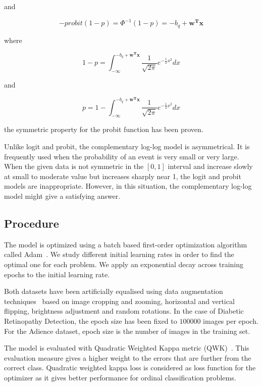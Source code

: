 \documentclass[journal]{IEEEtran}
\begin{document}
\begin{enumerate}
		and
		
		\begin{equation}
		-probit(1-p) = \Phi^{-1}(1-p) = -b_q + \mathbf{w^Tx}
		\end{equation}
		
		where
		
		\begin{equation}
		1 - p = \int_{-\infty}^{-b_q + \mathbf{w^Tx}} \frac{1}{\sqrt{2\pi}} e^{-\frac{1}{2}x^2} dx
		\end{equation}
		
		and
		
		\begin{equation}
		p = 1 - \int_{-\infty}^{-b_q + \mathbf{w^Tx}} \frac{1}{\sqrt{2\pi}} e^{-\frac{1}{2}x^2} dx
		\end{equation}

		the symmetric property for the probit function has been proven.
	\end{enumerate}
	
	
	Unlike logit and probit, the complementary log-log model is asymmetrical. It is frequently used when the probability of an event is very small or very large. When the given data is not symmetric in the $[0,1]$ interval and increase slowly at small to moderate value but increases sharply near 1, the logit and probit models are inappropriate. However, in this situation, the complementary log-log model might give a satisfying answer.
	
	\subsection{Procedure}
	The model is optimized using a batch based first-order optimization algorithm called Adam~\cite{kingma2014adam}. We study different initial learning rates in order to find the optimal one for each problem. We apply an exponential decay across training epochs to the initial learning rate.
	
	Both datasets have been artificially equalised using data augmentation techniques~\cite{van2001art, krizhevsky2012imagenet} based on image cropping and zooming, horizontal and vertical flipping, brightness adjustment and random rotations. In the case of Diabetic Retinopathy Detection, the epoch size has been fixed to $100000$ images per epoch. For the Adience dataset, epoch size is the number of images in the training set.
	
	The model is evaluated with Quadratic Weighted Kappa metric (QWK)~\cite{ben2008comparison}. This evaluation measure gives a higher weight to the errors that are further from the correct class. Quadratic weighted kappa loss is considered as loss function for the optimizer as it gives better performance for ordinal classification problems.
	
\end{document}
